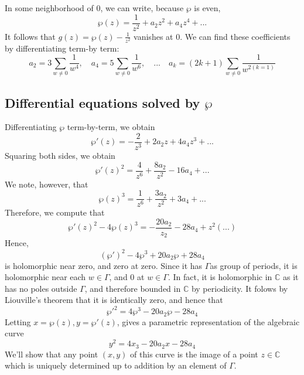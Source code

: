 \documentclass{article}
\newcommand{\mbb}[1]{\mathbb{#1}}
\begin{document}
In some neighborhood of 0, we can write, because \(\wp\) is even,
\begin{equation}\wp(z) = \frac{1}{z^2} + a_2z^2 + a_4z^4 + ...\end{equation}
It follows that \(g(z) = \wp(z) - \frac{1}{z^2}\) vanishes at 0. We can find these coefficients by differentiating term-by term:
\begin{equation}a_2 = 3\sum_{w \neq 0}\frac{1}{w^4}, \quad a_4 = 5\sum_{w \neq 0}\frac{1}{w^6}, \quad ... \quad a_k = (2k + 1)\sum_{w \neq 0}\frac{1}{w^{2(k = 1)}}\end{equation}

\subsection{Differential equations solved by \(\wp\)}

Differentiating \(\wp\) term-by-term, we obtain
\begin{equation}\wp'(z) = -\frac{2}{z^3} + 2a_2z + 4a_4z^3 + ...\end{equation}
Squaring both sides, we obtain
\begin{equation}\wp'(z)^2 = \frac{4}{z^6} + \frac{8a_2}{z^2} - 16a_4 + ...\end{equation}
We note, however, that
\begin{equation}\wp(z)^3 = \frac{1}{z^6} + \frac{3a_2}{z^2} + 3a_4 + ...\end{equation}
Therefore, we compute that
\begin{equation}\wp'(z)^2 - 4\wp(z)^3 = -\frac{20a_2}{z_2} - 28a_4 + z^2(...)\end{equation}
Hence,
\begin{equation}(\wp')^2 - 4\wp^3 + 20a_2\wp + 28a_4\end{equation}
is holomorphic near zero, and zero at zero. Since it has \(\Gamma\)as group of periods, it is holomorphic near each \(w \in \Gamma\), and \(0\) at \(w \in \Gamma\). In fact, it is holomorphic in \(\mbb{C}\) as it has no poles outside \(\Gamma\), and therefore bounded in \(\mbb{C}\) by periodicity. It folows by Liouville's theorem that it is identically zero, and hence that
\begin{equation}\wp'^2 = 4\wp^3 - 20a_2\wp - 28a_4\end{equation}
Letting \(x = \wp(z), y = \wp'(z)\), gives a parametric representation of the algebraic curve
\begin{equation}y^2 = 4x_3 - 20a_2x - 28a_4\end{equation}
We'll show that any point \((x, y)\) of this curve is the image of a point \(z \in \mbb{C}\) which is uniquely determined up to addition by an element of \(\Gamma\).
\end{document}
